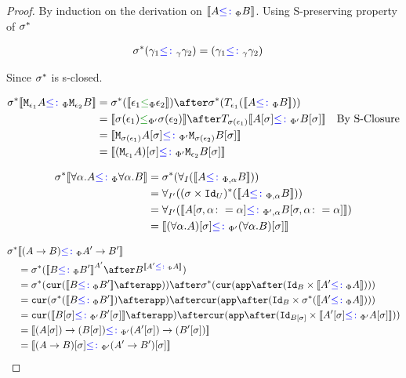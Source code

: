 \documentclass{report}
\begin{document}
\begin{framed}
    \begin{proof}
        
        By induction on the derivation on ${\bf [\![}A{\color{blue} \leq\colon}_\Phi B{\bf ]\!]}$. Using S-preserving property of $\sigma^*$ 
        
        \case{\sground}
        \begin{align*}
            \sigma^*(\gamma_1{\color{blue} \leq\colon}_\gamma\gamma_2) &= (\gamma_1{\color{blue} \leq\colon}_\gamma\gamma_2)
        \end{align*}
        
        Since $\sigma^*$ is s-closed.
        
        \case{\seffect}
        \begin{align*}
            \si\star\deno{\M{\e_1}{A} \subtypep \M{\e_2}{B}} & = \si\star(\deno{\e_1\subeffectp\e_2})\after\si\star(\T{\e_1}(\deno{A\subtypep B})) \\ 
             &= \deno{\si(\e_1)\subeffectpp\si(\e_2)} \after \T{\si(\e_1)}{\deno{A\ssi\subtypepp B\ssi}}\qt{By S-Closure}\\
             &= \deno{\M{\si(\e_1)}{A\ssi}\subtypepp\M{\si(\e_2)}{B\ssi}}\\
             &= \deno{(\M{\e_1}{A})\ssi\subtypepp\M{\e_2}{B}\ssi}\\
        \end{align*}
        
        \case{\squant}
            \begin{align*}
                \si\star\deno{\all{\a}{A}\subtypep\all{\a}{B}} &= \si\star(\allI(\deno{A\subtypepa B})) \\
                &=\allII((\si\times\Id{U})\star(\deno{A\subtypepa B}))\\
                &=\allII(\deno{A\sub{\si,\a\setto\a}\subtypeppa B\sub{\si,\a\setto\a}})\\
                &= \deno{(\all{\a}{A})\ssi \subtypepp(\all{\a}{B})\ssi}\\
            \end{align*}
        
        \case{\sfun}
        
        \begin{align*}
            \si\star&\deno{(\ab)\subtypep\fntype{A'}{B'}} \\
             &= \si\star(\deno{B\subtypep B'}^{A'}\after B^{\deno{A'\subtypep A}})\\
            &= \si\star(\cur{\deno{B\subtypep B'}\after\app})\after\si\star(\cur{\app\after(\Id{B}\times\deno{A'\subtypep A})})\\
            & = \cur{\si\star(\deno{B\subtypep B'})\after\app}\after\cur{\app\after(\Id{B}\times\si\star(\deno{A'\subtypep A}))}\\
            & = \cur{\deno{B\ssi\subtypepp B'\ssi}\after\app}\after\cur{\app\after(\Id{B\ssi}\times\deno{A'\ssi\subtypepp A\ssi})}\\
            &= \deno{\fntype{(A\ssi)}{(B\ssi)}\subtypepp\fntype{(A'\ssi)}{(B'\ssi)}}\\
            &= \deno{(\ab)\ssi\subtypepp(\fntype{A'}{B'})\ssi}
        \end{align*}
        

\end{proof}
\end{framed}
\end{document}
